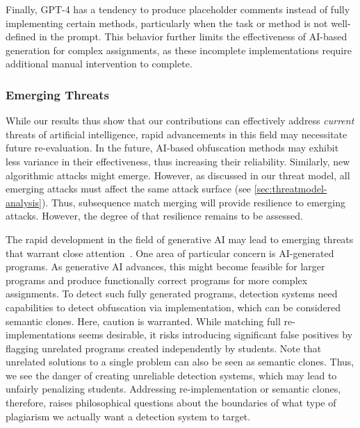 Finally, GPT-4 has a tendency to produce placeholder comments instead of fully implementing certain methods, particularly when the task or method is not well-defined in the prompt. This behavior further limits the effectiveness of AI-based generation for complex assignments, as these incomplete implementations require additional manual intervention to complete.

\subsubsection{Emerging Threats}

While our results thus show that our contributions can effectively address \textit{current} threats of artificial intelligence, rapid advancements in this field may necessitate future re-evaluation. In the future, AI-based obfuscation methods may exhibit less variance in their effectiveness, thus increasing their reliability.
Similarly, new algorithmic attacks might emerge.
%
However, as discussed in our threat model, all emerging attacks must affect the same attack surface (see \autoref{sec:threatmodel-analysis}). Thus, subsequence match merging will provide resilience to emerging attacks. However, the degree of that resilience remains to be assessed.

The rapid development in the field of generative AI may lead to emerging threats that warrant close attention~\cite{Lancaster2023}. One area of particular concern is AI-generated programs. As generative AI advances, this might become feasible for larger programs and produce functionally correct programs for more complex assignments.
%
To detect such fully generated programs, detection systems need capabilities to detect obfuscation via implementation, which can be considered semantic clones. Here, caution is warranted. While matching full re-implementations seems desirable, it risks introducing significant false positives by flagging unrelated programs created independently by students. Note that unrelated solutions to a single problem can also be seen as semantic clones. Thus, we see the danger of creating unreliable detection systems, which may lead to unfairly penalizing students. Addressing re-implementation or semantic clones, therefore, raises philosophical questions about the boundaries of what type of plagiarism we actually want a detection system to target.

